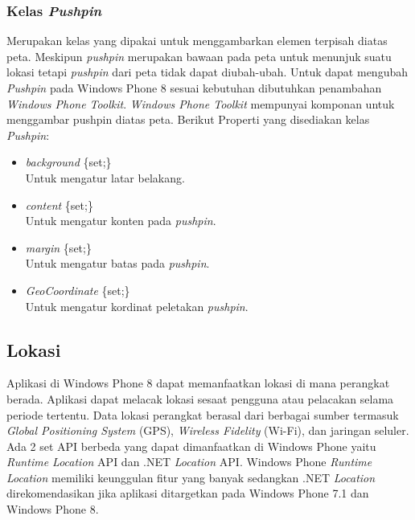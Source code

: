\subsubsection{Kelas \textit{Pushpin}}
\label{subsubsec:Pushpin Class}
\hspace{0.5cm} Merupakan kelas yang dipakai untuk menggambarkan elemen terpisah diatas peta. Meskipun \textit{pushpin} merupakan bawaan pada peta untuk menunjuk suatu lokasi tetapi \textit{pushpin} dari peta tidak dapat diubah-ubah. Untuk dapat mengubah \textit{Pushpin} pada Windows Phone 8 sesuai kebutuhan dibutuhkan penambahan \textit{Windows Phone Toolkit}. \textit{Windows Phone Toolkit} mempunyai komponan untuk menggambar pushpin diatas peta.  
Berikut Properti yang disediakan kelas \textit{Pushpin}:
\begin{itemize}
	\item \textit{background} \{set;\} \\
	Untuk mengatur latar belakang.
	\item \textit{content} \{set;\} \\
	Untuk mengatur konten pada \textit{pushpin}.
	\item \textit{margin} \{set;\} \\
	Untuk mengatur batas pada \textit{pushpin}.
	\item \textit{GeoCoordinate} \{set;\} \\
	Untuk mengatur kordinat peletakan \textit{pushpin}.
\end{itemize}

\subsection{Lokasi}
\label{subsec:Lokasi}
\hspace{0.5cm} Aplikasi di Windows Phone 8 dapat memanfaatkan lokasi di mana perangkat berada. Aplikasi dapat melacak lokasi sesaat  pengguna atau pelacakan selama periode tertentu. Data lokasi perangkat berasal dari berbagai sumber termasuk \textit{Global Positioning System} (GPS), \textit{Wireless Fidelity} (Wi-Fi), dan jaringan seluler. Ada 2 set API berbeda yang dapat dimanfaatkan di Windows Phone yaitu \textit{Runtime Location} API dan .NET \textit{Location} API. Windows Phone \textit{Runtime Location} memiliki keunggulan fitur yang banyak sedangkan .NET \textit{Location} direkomendasikan jika aplikasi ditargetkan pada Windows Phone 7.1 dan Windows Phone 8\cite{MSDN}.

